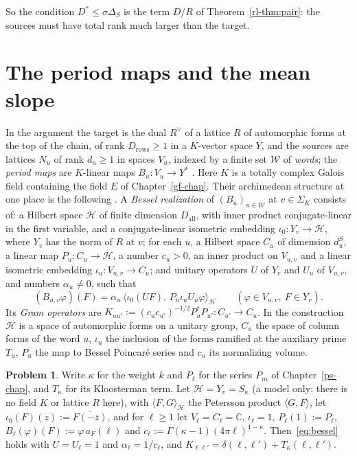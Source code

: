 \documentclass[reqno]{amsart}
\newcounter{chap}
\theoremstyle{definition}
\newtheorem{problem}{Problem}[section]
\theoremstyle{plain}
\newcommand{\C}{\mathbb{C}}
\newcommand{\Hc}{\mathcal{H}}
\newcommand{\Wc}{\mathcal{W}}
\newcommand{\Dall}{D_{\mathrm{all}}}
\newcommand{\Drows}{D_{\mathrm{rows}}}
\newcommand{\dS}{d^{S}}
\begin{document}
So the condition \(D^* \le \sigma\Delta_S\) is the term \(D/R\) of Theorem~\ref{rl-thm:pair}: the sources must have total rank much larger than the target.

\section{The period maps and the mean slope}\label{sec:A3}

In the argument the target is the dual \(R^\vee\) of a lattice \(R\) of automorphic forms at the top of the chain, of rank \(\Drows \ge 1\) in a \(K\)-vector space \(Y\), and the sources are lattices \(N_u\) of rank \(d_u \ge 1\) in spaces \(V_u\), indexed by a finite set \(\Wc\) of \emph{words}; the \emph{period maps} are \(K\)-linear maps \(B_u \colon V_u \to Y^*\) \cite[\S13.4]{Adr}.  Here \(K\) is a totally complex Galois field containing the field \(E\) of Chapter~\ref{gf-chap}.  Their archimedean structure at one place is the following \cite[Def.~13.13]{Adr}.  A \emph{Bessel realization} of \((B_u)_{u \in \Wc}\) at \(v \in \Sigma_K\) consists of: a Hilbert space \(\Hc\) of finite dimension \(\Dall\), with inner product conjugate-linear in the first variable, and a conjugate-linear isometric embedding \(\iota_0 \colon Y_v \to \Hc\), where \(Y_v\) has the norm of \(R\) at \(v\); for each \(u\), a Hilbert space \(C_u\) of dimension \(\dS_u\), a linear map \(P_u \colon C_u \to \Hc\), a number \(c_u > 0\), an inner product on \(V_{u,v}\) and a linear isometric embedding \(\iota_u \colon V_{u,v} \to C_u\); and unitary operators \(U\) of \(Y_v\) and \(U_u\) of \(V_{u,v}\), and numbers \(\alpha_u \ne 0\), such that
\begin{equation}\label{eq:bessel}
  (B_{u,v}\varphi)(F) = \alpha_u\,\bigl\langle \iota_0(UF),\, P_u\iota_uU_u\varphi \bigr\rangle_\Hc \qquad (\varphi \in V_{u,v},\ F \in Y_v) .
\end{equation}
Its \emph{Gram operators} are \(K_{uu'} := (c_uc_{u'})^{-1/2}P_u^*P_{u'} \colon C_{u'} \to C_u\).  In the construction \(\Hc\) is a space of automorphic forms on a unitary group, \(C_u\) the space of column forms of the word \(u\), \(\iota_u\) the inclusion of the forms ramified at the auxiliary prime \(T_u\), \(P_u\) the map to Bessel Poincar\'e series and \(c_u\) its normalizing volume.

\begin{problem}\label{pr:classical}
Write \(\kappa\) for the weight \(k\) and \(P_\ell\) for the series \(P_m\) of Chapter~\ref{ps-chap}, and \(T_\kappa\) for its Kloosterman term.  Let \(\Hc = Y_v = S_\kappa\) (a model only: there is no field \(K\) or lattice \(R\) here), with \(\langle F, G\rangle_\Hc\) the Petersson product \(\langle G, F\rangle\), let \(\iota_0(F)(z) := \overline{F(-\bar z)}\), and for \(\ell \ge 1\) let \(V_\ell = C_\ell = \C\), \(\iota_\ell = 1\), \(P_\ell(1) := P_\ell\), \(B_\ell(\varphi)(F) := \varphi\,a_F(\ell)\) and \(c_\ell := \Gamma(\kappa-1)(4\pi\ell)^{1-\kappa}\).  Then~\eqref{eq:bessel} holds with \(U = U_\ell = 1\) and \(\alpha_\ell = 1/c_\ell\), and \(K_{\ell\ell'} = \delta(\ell, \ell') + T_\kappa(\ell, \ell')\).
\end{problem}
\end{document}

